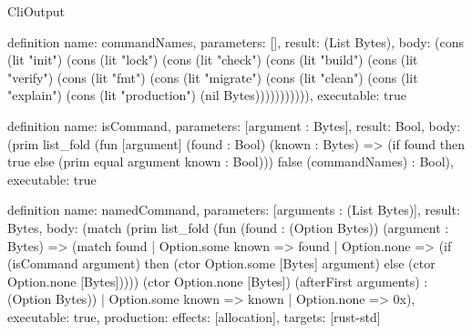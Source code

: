 \begin{lexlean}{CliOutput}
\begin{semanticmodule}
definition{
  name: commandNames,
  parameters: [],
  result: (List Bytes),
  body: (cons (lit "init") (cons (lit "lock") (cons (lit "check") (cons (lit "build") (cons (lit "verify") (cons (lit "fmt") (cons (lit "migrate") (cons (lit "clean") (cons (lit "explain") (cons (lit "production") (nil Bytes))))))))))),
  executable: true
}

definition{
  name: isCommand,
  parameters: [argument : Bytes],
  result: Bool,
  body: (prim list_fold (fun [argument] (found : Bool) (known : Bytes) => (if found then true else (prim equal argument known : Bool))) false (commandNames) : Bool),
  executable: true
}

definition{
  name: namedCommand,
  parameters: [arguments : (List Bytes)],
  result: Bytes,
  body: (match (prim list_fold (fun (found : (Option Bytes)) (argument : Bytes) => (match found
      | Option.some known => found
      | Option.none => (if (isCommand argument) then (ctor Option.some [Bytes] argument) else (ctor Option.none [Bytes])))) (ctor Option.none [Bytes]) (afterFirst arguments) : (Option Bytes))
    | Option.some known => known
    | Option.none => 0x),
  executable: true,
  production: {effects: [allocation], targets: [rust-std]}
}
\end{semanticmodule}
\end{lexlean}
